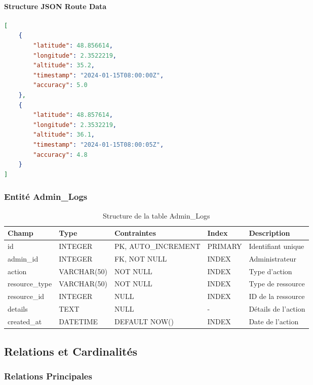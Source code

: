 \paragraph{Structure JSON Route Data}
\begin{lstlisting}[language=json]
[
    {
        "latitude": 48.856614,
        "longitude": 2.3522219,
        "altitude": 35.2,
        "timestamp": "2024-01-15T08:00:00Z",
        "accuracy": 5.0
    },
    {
        "latitude": 48.857614,
        "longitude": 2.3532219,
        "altitude": 36.1,
        "timestamp": "2024-01-15T08:00:05Z",
        "accuracy": 4.8
    }
]
\end{lstlisting}

\subsubsection{Entité Admin\_Logs}

\begin{table}[H]
\centering
\begin{tabular}{|l|l|l|l|p{4cm}|}
\hline
\textbf{Champ} & \textbf{Type} & \textbf{Contraintes} & \textbf{Index} & \textbf{Description} \\
\hline
id & INTEGER & PK, AUTO\_INCREMENT & PRIMARY & Identifiant unique \\
admin\_id & INTEGER & FK, NOT NULL & INDEX & Administrateur \\
action & VARCHAR(50) & NOT NULL & INDEX & Type d'action \\
resource\_type & VARCHAR(50) & NOT NULL & INDEX & Type de ressource \\
resource\_id & INTEGER & NULL & INDEX & ID de la ressource \\
details & TEXT & NULL & - & Détails de l'action \\
created\_at & DATETIME & DEFAULT NOW() & INDEX & Date de l'action \\
\hline
\end{tabular}
\caption{Structure de la table Admin\_Logs}
\end{table}

\subsection{Relations et Cardinalités}

\subsubsection{Relations Principales}

